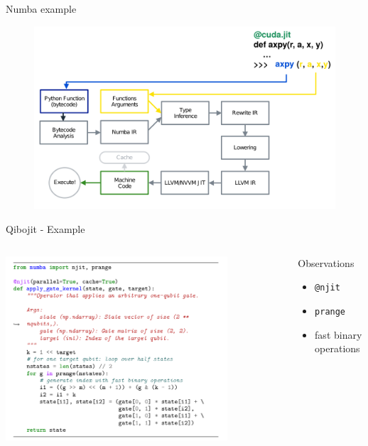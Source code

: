 \documentclass[11p,aspectratio=169]{beamer}
\begin{document}
\begin{frame}{Numba example}
    \begin{figure}
        \includegraphics[width= \textwidth]{figures/how_numba.png}
    \end{figure}
    
\end{frame}


\begin{frame}[fragile]{Qibojit - Example}

    \begin{columns}
        \begin{column}{0.7\textwidth}
            \hspace{1cm}
            \includegraphics[width = 0.8\textwidth]{figures/circuit.png}
        \end{column}

        \begin{column}{0.6\textwidth}
            Observations
            \begin{itemize}
                \item \texttt{@njit}
                \item \texttt{prange}
                \item fast binary operations
            \end{itemize}
        \end{column}
    \end{columns}

    
\end{frame}
\end{document}
